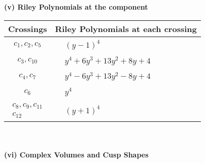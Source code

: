 \documentclass[1p]{elsarticle_modified}
\theoremstyle{definition}
\begin{document}
\newpage\renewcommand{\arraystretch}{1}
\flushleft \textbf{(v) Riley Polynomials at the component}\newline \\
\begin{tabular}{m{50pt}|m{274pt}}
Crossings & \hspace{64pt}Riley Polynomials at each crossing \\
\hline $$\begin{aligned}c_{1},c_{2},c_{5}\end{aligned}$$&$\begin{aligned}
&(y-1)^4
\end{aligned}$\\
\hline $$\begin{aligned}c_{3},c_{10}\end{aligned}$$&$\begin{aligned}
&y^4+6 y^3+13 y^2+8 y+4
\end{aligned}$\\
\hline $$\begin{aligned}c_{4},c_{7}\end{aligned}$$&$\begin{aligned}
&y^4-6 y^3+13 y^2-8 y+4
\end{aligned}$\\
\hline $$\begin{aligned}c_{6}\end{aligned}$$&$\begin{aligned}
&y^4
\end{aligned}$\\
\hline $$\begin{aligned}c_{8},c_{9},c_{11}\\c_{12}\end{aligned}$$&$\begin{aligned}
&(y+1)^4
\end{aligned}$\\
\hline
\end{tabular}\\~\\
\newpage\flushleft \textbf{(vi) Complex Volumes and Cusp Shapes}
\end{document}

